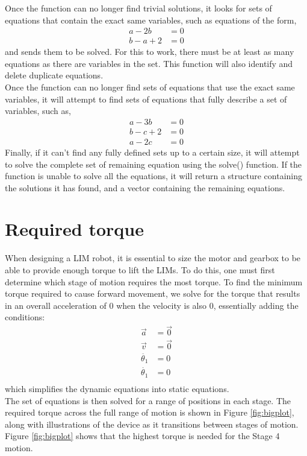 Once the function can no longer find trivial solutions, it looks for sets of equations that contain the exact same variables, such as equations of the form,
\begin{subequations}
	\begin{align}
		a -2b &= 0\\
		b -a +2 &= 0 
	\end{align}
\end{subequations}
and sends them to be solved. For this to work, there must be at least as many equations as there are variables in the set. This function will also identify and delete duplicate equations.\\
Once the function can no longer find sets of equations that use the exact same variables, it will attempt to find sets of equations that fully describe a set of variables, such as,
\begin{subequations}
	\begin{align}
		a -3b &= 0\\
		b -c +2&= 0\\
		a -2c &= 0
	\end{align}
\end{subequations}
Finally, if it can't find any fully defined sets up to a certain size, it will attempt to solve the complete set of remaining equation using the solve() function. If the function is unable to solve all the equations, it will return a structure containing the solutions it has found, and a vector containing the remaining equations.


\section{Required torque}
When designing a LIM robot, it is essential to size the motor and gearbox to be able to provide enough torque to lift the LIMs. To do this, one must first determine which stage of motion requires the most torque. To find the minimum torque required to cause forward movement, we solve for the torque that results in an overall acceleration of 0 when the velocity is also 0, essentially adding the conditions:
\begin{subequations}
	\label{condition-static}
	\begin{align}
		\vec{a} &= \vec{0}\\
		\vec{v} &= \vec{0}\\
		\ddot{\theta_1} &= 0\\
		\dot{\theta_1} &= 0\\
	\end{align}
\end{subequations}
which simplifies the dynamic equations into static equations.\\
The set of equations is then solved for a range of positions in each stage. The required torque across the full range of motion is shown in Figure \ref{fig:bigplot}, along with illustrations of the device as it transitions between stages of motion. Figure \ref{fig:bigplot} shows that the highest torque is needed for the Stage 4 motion.\\


